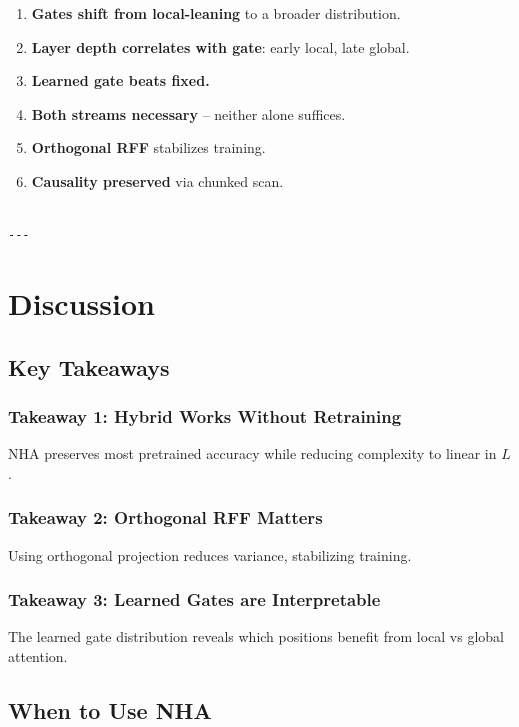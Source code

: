 \begin{enumerate}
\item \textbf{Gates shift from local-leaning} to a broader distribution.
\item \textbf{Layer depth correlates with gate}: early local, late global.
\item \textbf{Learned gate beats fixed.}
\item \textbf{Both streams necessary} -- neither alone suffices.
\item \textbf{Orthogonal RFF} stabilizes training.
\item \textbf{Causality preserved} via chunked scan.
\end{enumerate}
\begin{lstlisting}

---
\end{lstlisting}


\section{Discussion}

\subsection{Key Takeaways}

\subsubsection{Takeaway 1: Hybrid Works Without Retraining}

NHA preserves most pretrained accuracy while reducing complexity to linear 
in $L$.

\subsubsection{Takeaway 2: Orthogonal RFF Matters}

Using orthogonal projection reduces variance, stabilizing training.

\subsubsection{Takeaway 3: Learned Gates are Interpretable}

The learned gate distribution reveals which positions benefit from local vs 
global attention.

\subsection{When to Use NHA}

